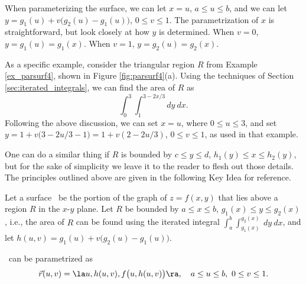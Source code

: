 When parameterizing the surface, we can let $x=u$, $a\leq u\leq b$, and we can let $y = g_1(u)+v\big(g_2(u)-g_1(u)\big)$, $0\leq v\leq 1$. The parametrization of $x$ is straightforward, but look closely at how $y$ is determined. When $v=0$, $y=g_1(u) = g_1(x)$. When $v=1$, $y= g_2(u)=g_2(x)$. 


 As a specific example, consider the triangular region $R$ from Example \ref{ex_parsurf4}, shown in Figure \ref{fig:parsurf4}(a). Using the techniques of Section \ref{sec:iterated_integrals}, we can find the area of $R$ as
$$\int_0^3\int_1^{3-2x/3} dy\ dx.$$
Following the above discussion, we can set $x=u$, where $0\leq u\leq 3$, and set $y = 1+ v\big(3-2u/3-1\big) = 1+v(2-2u/3)$, $0\leq v\leq 1$, as used in that example.

One can do a similar thing if $R$ is bounded by $c\leq y\leq d$, $h_1(y)\leq x\leq h_2(y)$, but for the sake of simplicity we leave it to the reader to flesh out those details. The principles outlined above are given in the following Key Idea for reference.

{Let a surface \surfaceS\ be the portion of the graph of $z=f(x,y)$ that lies above a region $R$ in the $x$-$y$ plane. Let $R$ be bounded by $a\leq x\leq b$, $g_1(x)\leq y\leq g_2(x)$, i.e., the area of $R$ can be found using the iterated integral $\int_a^b\int_{g_1(x)}^{g_2(x)}\ dy\ dx$, and let $h(u,v) = g_1(u)+v\big(g_2(u)-g_1(u)\big)$. 

\surfaceS\ can be parametrized as 
$$\vec r(u,v) = \la u, h(u,v), f\big(u,h(u,v)\big)\ra,\quad a\leq u\leq b,\ 0\leq v\leq 1.$$
}\\

